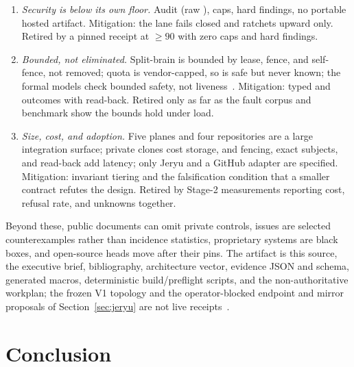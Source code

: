 \documentclass[journal]{IEEEtran}
\newcommand{\code}[1]{\texttt{\detokenize{#1}}}
\begin{document}
\begin{enumerate}
{gate.} One admitted gate, no per-gate executable digest, no multi-gate
aggregation; oracle-modifying diffs and any later evolutionary search are only
as strong as the sealed holdouts a team maintains~\cite{bulletEvo}. Mitigation:
attestor/broker separation, and holdout failures never reach authors. Retired
by a production gate catalog with digests and receipted holdout custody.
\item \emph{Security is below its own floor.} Audit \EvidenceAuditScore{} (raw
\EvidenceAuditRaw), \EvidenceAuditCaps{} caps, \EvidenceAuditHard{} hard
findings, no portable hosted artifact. Mitigation: the lane fails closed and
ratchets upward only. Retired by a pinned receipt at $\geq 90$ with zero caps
and hard findings.
\item \emph{Bounded, not eliminated.} Split-brain is bounded by lease, fence,
and self-fence, not removed; quota is vendor-capped, so \code{UNKNOWN} is safe
but never known; the formal models check bounded safety, not
liveness~\cite{bulletFormal}. Mitigation: typed \code{UNKNOWN} and
\code{CONTRADICTORY} outcomes with read-back. Retired only as far as the fault
corpus and benchmark show the bounds hold under load.
\item \emph{Size, cost, and adoption.} Five planes and four repositories are a
large integration surface; private clones cost storage, and fencing, exact
subjects, and read-back add latency; only Jeryu and a GitHub adapter are
specified. Mitigation: invariant tiering and the falsification condition that
a smaller contract refutes the design. Retired by Stage-2 measurements
reporting cost, refusal rate, and unknowns together.
\end{enumerate}

Beyond these, public documents can omit private controls, issues are selected
counterexamples rather than incidence statistics, proprietary systems are
black boxes, and open-source heads move after their pins. The artifact is this
source, the executive brief, bibliography, architecture vector, evidence JSON
and schema, generated macros, deterministic build/preflight scripts, and the
non-authoritative workplan; the frozen V1 topology and the operator-blocked
endpoint and mirror proposals of Section~\ref{sec:jeryu} are not live
receipts~\cite{bulletWorkplan}.

\section{Conclusion}
\end{document}
